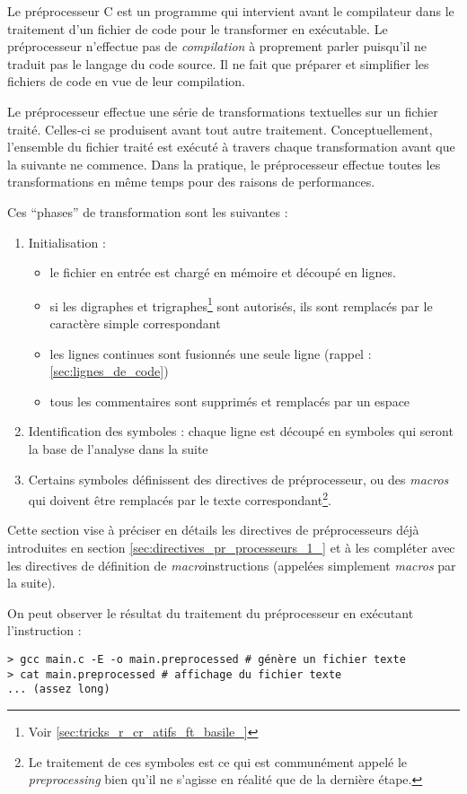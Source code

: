 \documentclass[../../../main.tex]{subfiles}
\begin{document}
Le préprocesseur C est un programme qui intervient avant le compilateur dans le traitement d'un fichier de code pour le transformer en exécutable. Le préprocesseur n'effectue pas de \textit{compilation} à proprement parler puisqu'il ne traduit pas le langage du code source. Il ne fait que préparer et simplifier les fichiers de code en vue de leur compilation.

Le préprocesseur effectue une série de transformations textuelles sur un fichier traité. Celles-ci se produisent avant tout autre traitement. Conceptuellement, l'ensemble du fichier traité est exécuté à travers chaque transformation avant que la suivante ne commence. Dans la pratique, le préprocesseur effectue toutes les transformations en même temps pour des raisons de performances.

Ces ``phases'' de transformation sont les suivantes :
\begin{enumerate}
	\item Initialisation :
	\begin{itemize}
		\item le fichier en entrée est chargé en mémoire et découpé en lignes.
		\item si les digraphes et trigraphes\footnote{Voir \ref{sec:tricks_r_cr_atifs_ft_basile_}} sont autorisés, ils sont remplacés par le caractère simple correspondant 
		\item les lignes continues sont fusionnés une seule ligne (rappel : \ref{sec:lignes_de_code})
		\item tous les commentaires sont supprimés et remplacés par un espace
	\end{itemize}
	\item Identification des symboles : chaque ligne est découpé en symboles qui seront la base de l'analyse dans la suite
	\item Certains symboles définissent des directives de préprocesseur, ou des \textit{macros} qui doivent être remplacés par le texte correspondant\footnote{Le traitement de ces symboles est ce qui est communément appelé le \textit{preprocessing} bien qu'il ne s'agisse en réalité que de la dernière étape.}.
\end{enumerate}	
Cette section vise à préciser en détails les directives de préprocesseurs déjà introduites en section \ref{sec:directives_pr_processeurs_1_} et à les compléter avec les directives de définition de \textit{macro}instructions (appelées simplement \textit{macros} par la suite).

On peut observer le résultat du traitement du préprocesseur en exécutant l'instruction :
\begin{verbatim}
> gcc main.c -E -o main.preprocessed # génère un fichier texte
> cat main.preprocessed # affichage du fichier texte
... (assez long)
\end{verbatim}
\end{document}
